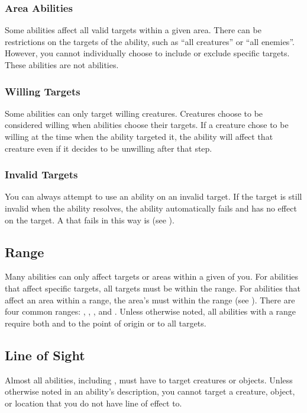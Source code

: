         \subsubsection{Area Abilities}
            Some abilities affect all valid targets within a given area.
            There can be restrictions on the targets of the ability, such as ``all creatures'' or ``all enemies''.
            However, you cannot individually choose to include or exclude specific targets.
            These abilities are not  abilities.

        \subsubsection{Willing Targets}
            Some abilities can only target willing creatures.
            Creatures choose to be considered willing when abilities choose their targets.
            If a creature chose to be willing at the time when the ability targeted it, the ability will affect that creature even if it decides to be unwilling after that step.

        \subsubsection{Invalid Targets}
            You can always attempt to use an ability on an invalid target.
            If the target is still invalid when the ability resolves, the ability automatically fails and has no effect on the target.
            A  that fails in this way is  (see ).

    \subsection{Range}\label{Range}
        Many abilities can only affect targets or areas within a given  of you.
        For abilities that affect specific targets, all targets must be within the range.
        For abilities that affect an area within a range, the area's  must within the range (see ).
        There are four common ranges: \rngclose, \rngmed, \rnglong, and \rngext.
        Unless otherwise noted, all abilities with a range require both  and  to the point of origin or to all targets.

    \subsection{Line of Sight}\label{Line of Sight}
        Almost all abilities, including , must have  to target creatures or objects.
        Unless otherwise noted in an ability's description, you cannot target a creature, object, or location that you do not have line of effect to.

